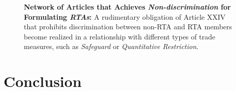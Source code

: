 \documentclass[12pt,letterpaper]{article}
\begin{document}
\begin{figure}[ht]
  \centering{
    
  }
  \caption{{\bf Network of Articles that Achieves \textit{Non-discrimination} for Formulating \textit{RTAs}:}
    A rudimentary obligation of Article XXIV that prohibits discrimination between non-RTA and RTA members become realized in a relationship with
    different types of trade measures, such as \textit{Safeguard} or \textit{Quantitative Restriction}.
  }
  \label{fig:rta-explained}
\end{figure}






% 

% 

\section{Conclusion}

\clearpage

\end{document}
